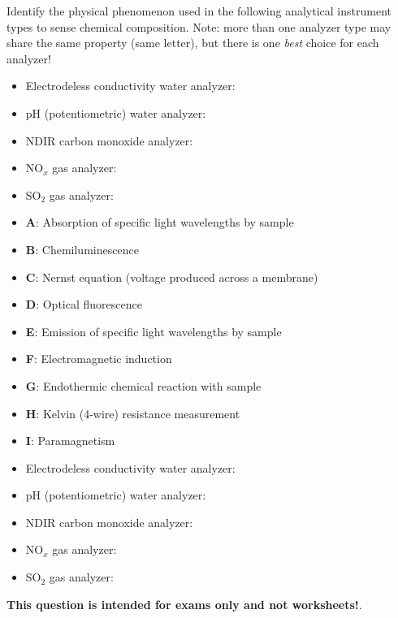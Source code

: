 

Identify the physical phenomenon used in the following analytical instrument types to sense chemical composition.  Note: more than one analyzer type may share the same property (same letter), but there is one {\it best} choice for each analyzer!

\begin{itemize}
\item{} Electrodeless conductivity water analyzer: \underbar{\hskip 50pt}
\item{} pH (potentiometric) water analyzer: \underbar{\hskip 50pt}
\item{} NDIR carbon monoxide analyzer: \underbar{\hskip 50pt}
\item{} NO$_{x}$ gas analyzer: \underbar{\hskip 50pt}
\item{} SO$_{2}$ gas analyzer: \underbar{\hskip 50pt}
\end{itemize}

\vskip 10pt

\begin{itemize}
\item {\bf A}: Absorption of specific light wavelengths by sample
\item {\bf B}: Chemiluminescence
\item {\bf C}: Nernst equation (voltage produced across a membrane)
\item {\bf D}: Optical fluorescence
\item {\bf E}: Emission of specific light wavelengths by sample
\item {\bf F}: Electromagnetic induction
\item {\bf G}: Endothermic chemical reaction with sample
\item {\bf H}: Kelvin (4-wire) resistance measurement 
\item {\bf I}: Paramagnetism
\end{itemize}







\begin{itemize}
\item{} Electrodeless conductivity water analyzer: 
\item{} pH (potentiometric) water analyzer: 
\item{} NDIR carbon monoxide analyzer: 
\item{} NO$_{x}$ gas analyzer: 
\item{} SO$_{2}$ gas analyzer: 
\end{itemize}







{\bf This question is intended for exams only and not worksheets!}.




